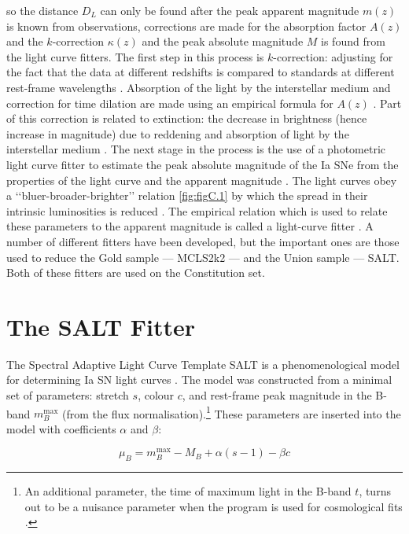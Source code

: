 so the distance $D_L$ can only be found after the peak apparent magnitude $m(z)$ is known from observations, corrections are made for the absorption factor $A(z)$ and the $k$-correction $\kappa(z)$ and the peak absolute magnitude $M$ is found from the light curve fitters. 
The first step in this process is $k$-correction: adjusting for the fact that the data at different redshifts is compared to standards at different rest-frame wavelengths \cite{Hogg2002}. 
Absorption of the light by the interstellar medium and correction for time dilation are made using an empirical formula for $A(z)$ \cite{Blondin2008}. Part of this correction is related to extinction: the decrease in brightness (hence increase in magnitude) due to reddening and absorption of light by the interstellar medium \cite{Hogg2002}. 
The next stage in the process is the use of a photometric light curve fitter to estimate the peak absolute magnitude of the Ia SNe from the properties of the light curve and the apparent magnitude \cite{Lidman2010b}. The light curves obey a \lq\lq{}bluer-broader-brighter\rq\rq{} relation \cref{fig:figC.1} by which the spread in their intrinsic luminosities is reduced \cite{Hicken2009}. The empirical relation which is used to relate these parameters to the apparent magnitude is called a light-curve fitter \cite{Guy2005}. A number of different fitters have been developed, but the important ones are those used to reduce the Gold sample — MCLS2k2 — and the Union sample — SALT. Both of these fitters are used on the Constitution set.

\section{The SALT Fitter}
\label{sec:C.2}

The Spectral Adaptive Light Curve Template SALT is a phenomenological model for determining Ia SN light curves \cite{Guy2005}. The model was constructed from a minimal set of parameters: stretch $s$, colour $c$, and rest-frame peak magnitude in the B-band $m_{B}^{\mathrm{max}}$ (from the flux normalisation).\footnote{An additional parameter, the time of maximum light in the B-band $t$, turns out to be a nuisance parameter when the program is used for cosmological fits \cite{Guy2005}.} These parameters are inserted into the model with coefficients $\alpha$ and $\beta$:

\begin{equation}
    \mu_{B}
    = m_{B}^{\mathrm{max}} - M_{B}
    + \alpha(s-1)
    - \beta c
\label{eq:salt-distance-modulus}
\end{equation}

